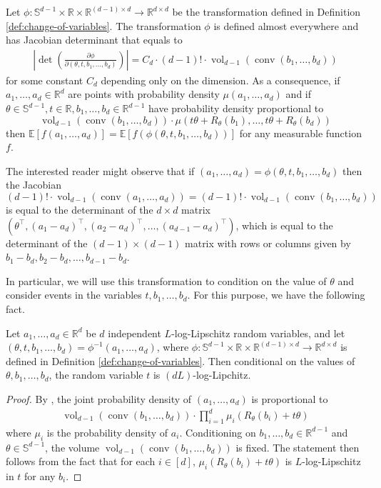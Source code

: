 \documentclass{theoretics}
\newcommand{\R}{\mathbb R}
\newcommand{\E}{\mathbb E}
\newcommand{\sfe}{\mathbb{S}^{d-1}}
\newcommand{\conv}{\operatorname{conv}}
\newcommand{\vol}{\operatorname{vol}}
\begin{document}
\begin{lemma}\label{lem:smooth-jacobian}
    Let $\phi: \sfe \times \R \times \R^{(d-1) \times d} \to \R^ {d \times d}$ be the transformation defined in Definition \ref{def:change-of-variables}.
    The transformation $\phi$ is defined almost everywhere and has Jacobian determinant that equals to
    \begin{align*}
        \left| \det\left(\frac{\partial \phi}{\partial (\theta,t,b_1,\dots,b_d)}\right)\right| = C_d \cdot (d-1)! \cdot \vol_{d-1}(\conv(b_1,\ldots,b_d))
    \end{align*}
    for some constant $C_d$ depending only on the dimension.
    As a consequence, if $a_1,\dots,a_d \in \R^d$ are points with probability density $\mu(a_1,\dots,a_d)$
    and if $\theta \in \sfe, t \in \R, b_1,\dots,b_d \in \R^{d-1}$ have probability density proportional to
    \[
        \vol_{d-1}(\conv(b_1,\dots,b_d)) \cdot \mu(t\theta + R_\theta(b_1),\dots,t\theta + R_\theta(b_d))
    \]
    then $\E[f(a_1,\dots,a_d)] = \E[f(\phi(\theta,t,b_1,\dots,b_d))]$ for any measurable function $f$.
\end{lemma}
The interested reader might observe that if $(a_1,\dots,a_d)=\phi(\theta,t,b_1,\dots,b_d)$ then the Jacobian
\[(d-1)! \cdot \vol_{d-1}(\conv(a_1,\ldots,a_d)) = (d-1)! \cdot \vol_{d-1}(\conv(b_1,\ldots,b_d))\]
is equal to the determinant of the $d \times d$ matrix $(\theta^\top, (a_1-a_d)^\top,(a_2-a_d)^\top,\dots,(a_{d-1}-a_d)^\top)$,
which is equal to the determinant of the $(d-1) \times (d-1)$ matrix with rows or columns given by
$b_1-b_d,b_2-b_d,\dots,b_{d-1}-b_d$.

In particular, we will use this transformation to condition on the value of $\theta$
and consider events in the variables $t,b_1,\dots,b_d$. For this purpose, we have the following fact.
\begin{lemma}\label{fact:joint-t-log-lipschitz}
    Let $a_1, \ldots, a_d \in \R^d$ be $d$ independent $L$-log-Lipschitz random variables,
    and let $(\theta, t, b_1,\dots,b_d) = \phi^{-1}(a_1,\dots,a_d)$, where $\phi: \sfe \times \R \times \R^{(d-1) \times d} \to \R^ {d \times d}$ is defined in Definition \ref{def:change-of-variables}.
    Then conditional on the values of $\theta, b_1,\dots,b_d$, the random variable $t$ is $(dL)$-log-Lipchitz.
\end{lemma}
\begin{proof}
    By , the joint probability density of $(a_1, \ldots, a_d)$ is proportional to
    \begin{align*}
        \vol_{d-1}(\conv(b_1, \ldots, b_d)) \cdot \prod_{i=1}^d \mu_i(R_{\theta}(b_i) + t\theta)
    \end{align*}
    where $\mu_i$ is the probability density of $a_i$.
    Conditioning on $b_1,\dots,b_d \in \R^{d-1}$ and $\theta \in \mathbb{S}^{d-1}$, the volume $\vol_{d-1}(\conv(b_1, \ldots, b_d))$ is fixed. 
    The statement then follows from the fact that for each $i \in [d]$, $\mu_i(R_{\theta}(b_i) + t\theta)$
    is $L$-log-Lipschitz in $t$ for any $b_i$.
\end{proof}
\end{document}
